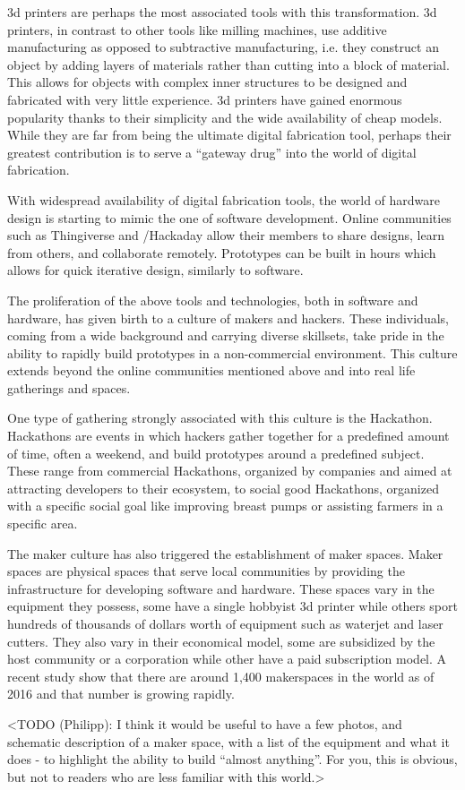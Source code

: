 3d printers are perhaps the most associated tools with this transformation. 3d printers, in contrast to other tools like milling machines, use additive manufacturing as opposed to subtractive manufacturing, i.e. they construct an object by adding layers of materials rather than cutting into a block of material. This allows for objects with complex inner structures to be designed and fabricated with very little experience. 3d printers have gained enormous popularity thanks to their simplicity and the wide availability of cheap models. While they are far from being the ultimate digital fabrication tool, perhaps their greatest contribution is to serve a ``gateway drug'' into the world of digital fabrication. 

With widespread availability of digital fabrication tools, the world of hardware design is starting to mimic the one of software development. Online communities such as Thingiverse\cite{thingverse} and /Hackaday\cite{hackaday} allow their members to share designs, learn from others, and collaborate remotely. Prototypes can be built in hours which allows for quick iterative design, similarly to software. 

The proliferation of the above tools and technologies, both in software and hardware, has given birth to a culture of makers and hackers. These individuals, coming from a wide background and carrying diverse skillsets, take pride in the ability to rapidly build prototypes in a non-commercial environment. This culture extends beyond the online communities mentioned above and into real life gatherings and spaces. 

One type of gathering strongly associated with this culture is the Hackathon. Hackathons are events in which hackers gather together for a predefined amount of time, often a weekend, and build prototypes around a predefined subject. These range from commercial Hackathons, organized by companies and aimed at attracting developers to their ecosystem, to social good Hackathons, organized with a specific social goal like improving breast pumps or assisting farmers in a specific area.   

The maker culture has also triggered the establishment of maker spaces. Maker spaces are physical spaces that serve local communities by providing the infrastructure for developing software and hardware. These spaces vary in the equipment they possess, some have a single hobbyist 3d printer while others sport hundreds of thousands of dollars worth of equipment such as waterjet and laser cutters. They also vary in their economical model, some are subsidized by the host community or a corporation while other have a paid subscription model. A recent study show that there are around 1,400 makerspaces in the world as of 2016 and that number is growing rapidly\cite{makersbynumbers}.

<TODO (Philipp): I think it would be useful to have a few photos, and schematic description of a maker space, with a list of the equipment and what it does - to highlight the ability to build “almost anything”. For you, this is obvious, but not to readers who are less familiar with this world.>